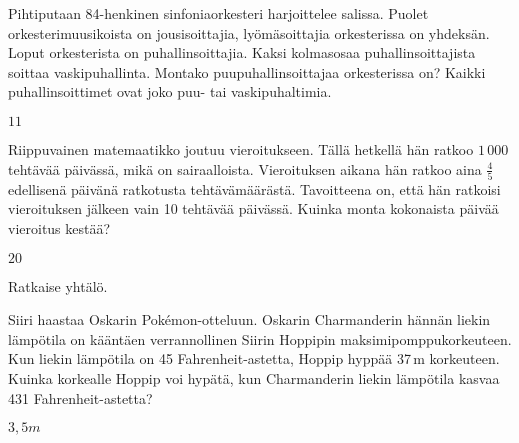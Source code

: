 \begin{tehtava}
	Pihtiputaan 84-henkinen sinfoniaorkesteri harjoittelee salissa. Puolet orkesterimuusikoista on jousisoittajia, lyömäsoittajia orkesterissa on yhdeksän. Loput orkesterista on puhallinsoittajia. Kaksi kolmasosaa puhallinsoittajista soittaa vaskipuhallinta. Montako puupuhallinsoittajaa orkesterissa on? Kaikki puhallinsoittimet ovat joko puu- tai vaskipuhaltimia. 
	

\begin{vastaus}
	$11$
\end{vastaus}
\end{tehtava}

\begin{tehtava}
	Riippuvainen matemaatikko joutuu vieroitukseen. Tällä hetkellä hän ratkoo $1\,000$ tehtävää päivässä, mikä on sairaalloista. Vieroituksen aikana hän ratkoo aina $\frac{4}{5}$ edellisenä päivänä ratkotusta tehtävämäärästä. Tavoitteena on, että hän ratkoisi vieroituksen jälkeen vain 10 tehtävää päivässä. Kuinka monta kokonaista päivää vieroitus kestää?
	

\begin{vastaus}
	$20$
\end{vastaus}
\end{tehtava}

\begin{tehtava}
	Ratkaise yhtälö.
	\begin{alakohdat}
	
	\end{alakohdat}
	

\begin{vastaus}
	\begin{alakohdat}
		\alakohta{$x=-6$}
		\alakohta{$x=-\frac{5}{9}$}
		
	\end{alakohdat}
\end{vastaus}
\end{tehtava}

\begin{tehtava}
	Siiri haastaa Oskarin Pokémon-otteluun. Oskarin Charmanderin hännän liekin lämpötila on kääntäen verrannollinen Siirin Hoppipin maksimipomppukorkeuteen. Kun liekin lämpötila on 45 Fahrenheit-astetta, Hoppip hyppää 37\,m korkeuteen. Kuinka korkealle Hoppip voi hypätä, kun Charmanderin liekin lämpötila kasvaa 431 Fahrenheit-astetta?
	

\begin{vastaus}
	$3,5m$
\end{vastaus}
\end{tehtava}



